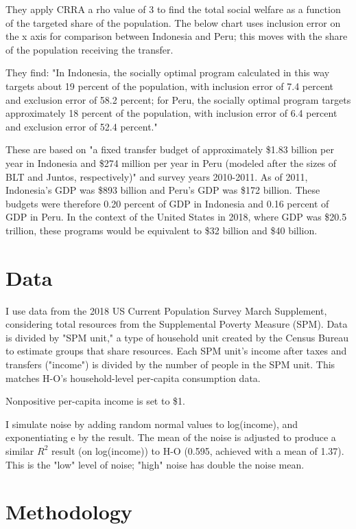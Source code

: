 \documentclass[12pt]{article}
\begin{document}
They apply CRRA a rho value of 3 to find the total social welfare as a function 
of the targeted share of the population. The below chart uses inclusion error 
on the x axis for comparison between Indonesia and Peru; this moves with the 
share of the population receiving the transfer.

They find: "In Indonesia, the socially optimal program calculated in this way 
targets about 19 percent of the population, with inclusion error of 7.4 percent 
and exclusion error of 58.2 percent; for Peru, the socially optimal program 
targets approximately 18 percent of the population, with inclusion error of 6.4 
percent and exclusion error of 52.4 percent."

These are based on "a fixed transfer budget of approximately \$1.83 billion per 
year in Indonesia and \$274 million per year in Peru (modeled after the sizes 
of BLT and Juntos, respectively)" and survey years 2010-2011. As of 2011, 
Indonesia's GDP was \$893 billion and Peru's GDP was \$172 billion. These 
budgets were therefore 0.20 percent of GDP in Indonesia and 0.16 percent of GDP 
in Peru. In the context of the United States in 2018, where GDP was \$20.5 
trillion, these programs would be equivalent to \$32 billion and \$40 billion.


\section{Data} \label{sec:data}

I use data from the 2018 US Current Population Survey March Supplement, 
considering total resources from the Supplemental Poverty Measure (SPM). Data 
is divided by "SPM unit," a type of household unit created by the Census Bureau 
to estimate groups that share resources. Each SPM unit's income after taxes and 
transfers ("income") is divided by the number of people in the SPM unit. This 
matches H-O's household-level per-capita consumption data.

Nonpositive per-capita income is set to \$1.

I simulate noise by adding random normal values to log(income), and 
exponentiating e by the result. The mean of the noise is adjusted to produce a 
similar $R^2$ result (on log(income)) to H-O (0.595, achieved with a mean of 
1.37). This is the "low" level of noise; "high" noise has double the noise mean.


\section{Methodology} \label{sec:methodology}
\end{document}
